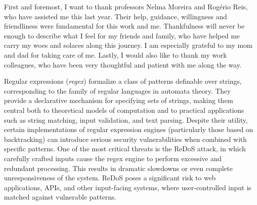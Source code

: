 








First and foremost, I want to thank professors Nelma Moreira and Rogério Reis, who have assisted me this last year. Their help, guidance, willingness and friendliness were fundamental for this work and me.
Thankfulness will never be enough to describe what I feel for my friends and family, who have helped me carry my woes and solaces along this journey. I am especially grateful to my mom and dad for taking care of me.
Lastly, I would also like to thank my work colleagues, who have been very thoughtful and patient with me along the way. 

\noindent Regular expressions (\emph{regex}) formalize a class of patterns definable over strings, corresponding to the family of regular languages in automata theory. They provide a declarative mechanism for specifying sets of strings, making them central both to theoretical models of computation and to practical applications such as string matching, input validation, and text parsing. Despite their utility, certain implementations of regular expression engines (particularly those based on backtracking) can introduce serious security vulnerabilities when combined with specific patterns. One of the most critical threats is the \ac{ReDoS} attack, in which carefully crafted inputs cause the regex engine to perform excessive and redundant processing. This results in dramatic slowdowns or even complete unresponsiveness of the system. \ac{ReDoS} poses a significant risk to web applications, APIs, and other input-facing systems, where user-controlled input is matched against vulnerable patterns.

